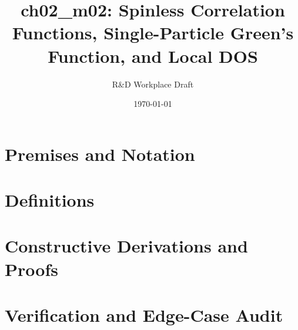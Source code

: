 \documentclass[11pt,a4paper]{article}
\title{\textbf{ch02\_m02: Spinless Correlation Functions, Single-Particle Green's Function, and Local DOS}}
\author{R\&D Workplace Draft}
\date{\today}
\theoremstyle{definition}
\theoremstyle{plain}
\theoremstyle{remark}
\begin{document}
\maketitle

\section{Premises and Notation}

\section{Definitions}

\section{Constructive Derivations and Proofs}

\section{Verification and Edge-Case Audit}
\end{document}
